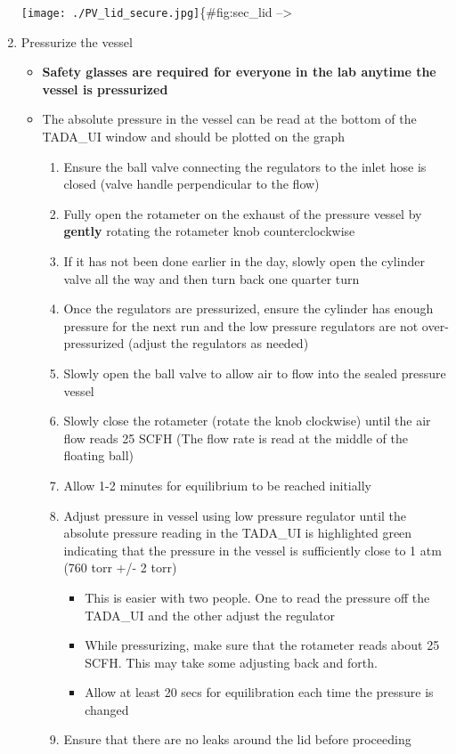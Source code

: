 \begin{enumerate}
  \texttt{[image: ./PV\_lid\_secure.jpg]}\{\#fig:sec\_lid
  --\textgreater{}
\item
  Pressurize the vessel

  \begin{itemize}
  \tightlist
  \item
    \textbf{Safety glasses are required for everyone in the lab anytime
    the vessel is pressurized}
  \item
    The absolute pressure in the vessel can be read at the bottom of the
    TADA\_UI window and should be plotted on the graph

    \begin{enumerate}
    \def\labelenumii{\arabic{enumii}.}
    \tightlist
    \item
      Ensure the ball valve connecting the regulators to the inlet hose
      is closed (valve handle perpendicular to the flow)
    \item
      Fully open the rotameter on the exhaust of the pressure vessel by
      \textbf{gently} rotating the rotameter knob counterclockwise
    \item
      If it has not been done earlier in the day, slowly open the
      cylinder valve all the way and then turn back one quarter turn
    \item
      Once the regulators are pressurized, ensure the cylinder has
      enough pressure for the next run and the low pressure regulators
      are not over-pressurized (adjust the regulators as needed)
    \item
      Slowly open the ball valve to allow air to flow into the sealed
      pressure vessel
    \item
      Slowly close the rotameter (rotate the knob clockwise) until the
      air flow reads 25 SCFH (The flow rate is read at the middle of the
      floating ball)
    \item
      Allow 1-2 minutes for equilibrium to be reached initially
    \item
      Adjust pressure in vessel using low pressure regulator until the
      absolute pressure reading in the TADA\_UI is highlighted green
      indicating that the pressure in the vessel is sufficiently close
      to 1 atm (760 torr +/- 2 torr)

      \begin{itemize}
      \tightlist
      \item
        This is easier with two people. One to read the pressure off the
        TADA\_UI and the other adjust the regulator
      \item
        While pressurizing, make sure that the rotameter reads about 25
        SCFH. This may take some adjusting back and forth.
      \item
        Allow at least 20 secs for equilibration each time the pressure
        is changed
      \end{itemize}
    \item
      Ensure that there are no leaks around the lid before proceeding


\end{enumerate}
\end{itemize}
\end{enumerate}
